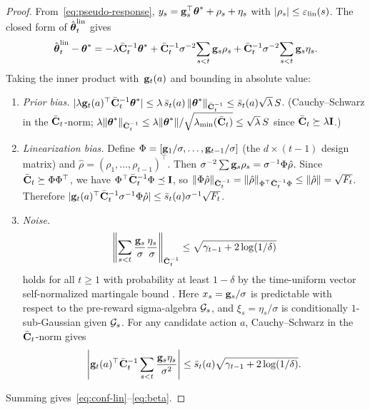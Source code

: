\documentclass[twoside]{article}
\begin{document}
\begin{proof}
From~\eqref{eq:pseudo-response},
$y_s = \mathbf{g}_s^\top\boldsymbol{\theta}^* + \rho_s + \eta_s$ with
$|\rho_s|\le\varepsilon_{\mathrm{lin}}(s)$.
The closed form of $\hat{\boldsymbol{\theta}}_t^{\mathrm{lin}}$ gives
\[
  \hat{\boldsymbol{\theta}}_t^{\mathrm{lin}} - \boldsymbol{\theta}^*
  = -\lambda\bar{\mathbf{C}}_t^{-1}\boldsymbol{\theta}^*
    + \bar{\mathbf{C}}_t^{-1}\sigma^{-2}\!\sum_{s<t}\mathbf{g}_s\rho_s
    + \bar{\mathbf{C}}_t^{-1}\sigma^{-2}\!\sum_{s<t}\mathbf{g}_s\eta_s.
\]
Taking the inner product with~$\mathbf{g}_t(a)$ and bounding in absolute value:
\begin{enumerate}[nosep,label=(\roman*)]
\item\emph{Prior bias.}\;
$|\lambda\mathbf{g}_t(a)^\top\bar{\mathbf{C}}_t^{-1}\boldsymbol{\theta}^*|
\le \lambda\,\bar s_t(a)\,\|\boldsymbol{\theta}^*\|_{\bar{\mathbf{C}}_t^{-1}}
\le \bar s_t(a)\sqrt{\lambda}\,S$.
(Cauchy--Schwarz in the $\bar{\mathbf{C}}_t$-norm;
$\lambda\|\boldsymbol{\theta}^*\|_{\bar{\mathbf{C}}_t^{-1}}
\le \lambda\|\boldsymbol{\theta}^*\|/\sqrt{\lambda_{\min}(\bar{\mathbf{C}}_t)}
\le \sqrt{\lambda}\,S$
since $\bar{\mathbf{C}}_t\succeq\lambda\mathbf{I}$.)
\item\emph{Linearization bias.}\;
Define $\Phi=[\mathbf{g}_1/\sigma,\dots,\mathbf{g}_{t-1}/\sigma]$ (the $d\times(t{-}1)$
design matrix) and $\hat\rho=(\rho_1,\dots,\rho_{t-1})^\top$.
Then $\sigma^{-2}\sum\mathbf{g}_s\rho_s = \sigma^{-1}\Phi\hat\rho$.
Since $\bar{\mathbf{C}}_t \succeq \Phi\Phi^\top$, we have
$\Phi^\top\bar{\mathbf{C}}_t^{-1}\Phi \preceq \mathbf{I}$, so
$\|\Phi\hat\rho\|_{\bar{\mathbf{C}}_t^{-1}}
= \|\hat\rho\|_{\Phi^\top\bar{\mathbf{C}}_t^{-1}\Phi}
\le \|\hat\rho\| = \sqrt{F_t}$.
Therefore
$|\mathbf{g}_t(a)^\top\bar{\mathbf{C}}_t^{-1}\sigma^{-1}\Phi\hat\rho|
\le \bar s_t(a)\sigma^{-1}\sqrt{F_t}$.
\item\emph{Noise.}\;
\[
  \left\|
  \sum_{s<t}\frac{\mathbf{g}_s}{\sigma}\frac{\eta_s}{\sigma}
  \right\|_{\bar{\mathbf{C}}_t^{-1}}
  \le
  \sqrt{\gamma_{t-1}+2\log(1/\delta)}
\]
holds for all $t\ge 1$ with probability at least $1-\delta$ by the
time-uniform vector self-normalized martingale bound
\citep{abbasi2011improved}.  Here $x_s=\mathbf{g}_s/\sigma$ is predictable
with respect to the pre-reward sigma-algebra $\mathcal{G}_s$, and
$\xi_s=\eta_s/\sigma$ is conditionally $1$-sub-Gaussian given
$\mathcal{G}_s$.  For any candidate action $a$, Cauchy--Schwarz in the
$\bar{\mathbf{C}}_t$-norm gives
\[
  \left|
  \mathbf{g}_t(a)^\top\bar{\mathbf{C}}_t^{-1}
  \sum_{s<t}\frac{\mathbf{g}_s\eta_s}{\sigma^2}
  \right|
  \le
  \bar s_t(a)\sqrt{\gamma_{t-1}+2\log(1/\delta)} .
\]

\end{enumerate}
Summing gives~\eqref{eq:conf-lin}--\eqref{eq:beta}.
\end{proof}
\end{document}
